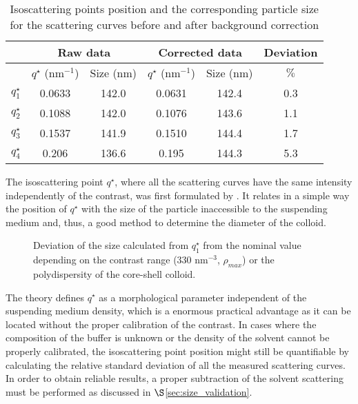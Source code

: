 \begin{table}
	\centering
	\begin{tabular}{l||cc|cc|c}
		 & \multicolumn{2}{c}{Raw data} & \multicolumn{2}{c}{Corrected data} & Deviation\\
		 \hline
		 & \( q^{\star} \) (nm\(^{-1}\))    &  Size (nm) & \( q^{\star}\) (nm\(^{-1}\))    &  Size (nm) & $\%$ \\
		\hline
		 \(q^{\star}_1\) &  0.0633 & 142.0 &  0.0631 & 142.4 & 0.3 \\
		 \(q^{\star}_2\) &  0.1088 & 142.0 &  0.1076 & 143.6 & 1.1   \\
		 \(q^{\star}_3\) &  0.1537 & 141.9 &  0.1510 & 144.4 & 1.7    \\
		 \(q^{\star}_4\) &  0.206  & 136.6 &  0.195  & 144.3 & 5.3     \\
		\end{tabular}
	\caption{Isoscattering points position and the corresponding particle size for the scattering curves before and after background correction}
	\label{tab:isoscattering_points}
\end{table}


The isoscattering point $q^{\star}$, where all the scattering curves have the same intensity independently of the contrast, was first formulated by \citep{kawaguchi_xray_1983}. It relates in a simple way the position of $q^{\star}$ with the size of the particle inaccessible to the suspending medium and, thus, a good method to determine the diameter of the colloid.

\begin{figure}%
	\centering

	\caption{Deviation of the size calculated from $q_1^{\star}$ from the nominal value depending on the contrast range (330 nm$^{-3}$, $\rho_{max}$) or the polydispersity of the core-shell colloid.}

\end{figure}

The theory defines $q^{\star}$ as a morphological parameter independent of the suspending medium density, which is a enormous practical advantage as it can be located without the proper calibration of the contrast. In cases where the composition of the buffer is unknown or the density of the solvent cannot be properly calibrated, the isoscattering point position might still be quantifiable by calculating the relative standard deviation of all the measured scattering curves. In order to obtain reliable results, a proper subtraction of the solvent scattering must be performed as discussed in $\S$\ref{sec:size_validation}.

